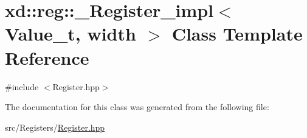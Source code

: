 \hypertarget{classxd_1_1reg_1_1___register__impl}{}\section{xd\+:\+:reg\+:\+:\+\_\+\+Register\+\_\+impl$<$ Value\+\_\+t, width $>$ Class Template Reference}
\label{classxd_1_1reg_1_1___register__impl}


{\ttfamily \#include $<$Register.\+hpp$>$}



The documentation for this class was generated from the following file\+:\begin{DoxyCompactItemize}
\item 
src/\+Registers/\mbox{\hyperlink{_register_8hpp}{Register.\+hpp}}\end{DoxyCompactItemize}
